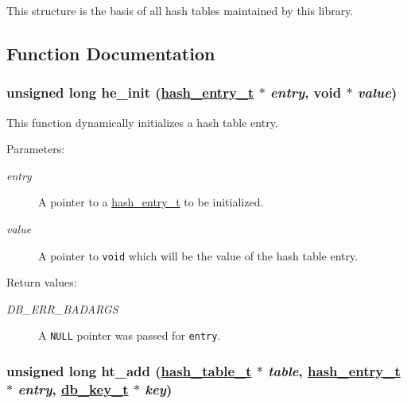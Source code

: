 This structure is the basis of all hash tables maintained by this library. 

\subsection{Function Documentation}
\hypertarget{group__dbprim__hash_a15}{
\subsubsection[he\_\-init]{\setlength{\rightskip}{0pt plus 5cm}unsigned long he\_\-init (\hyperlink{dbprim_8h_a1}{hash\_\-entry\_\-t} $\ast$ {\em entry}, void $\ast$ {\em value})}}
\label{group__dbprim__hash_a15}


This function dynamically initializes a hash table entry.

\begin{Desc}
\item[Parameters:]
\begin{description}
\item[{\em entry}]A pointer to a \hyperlink{group__dbprim__hash_a1}{hash\_\-entry\_\-t} to be initialized. \item[{\em value}]A pointer to {\tt void} which will be the value of the hash table entry.\end{description}
\end{Desc}
\begin{Desc}
\item[Return values:]
\begin{description}
\item[{\em DB\_\-ERR\_\-BADARGS}]A {\tt NULL} pointer was passed for {\tt entry}. \end{description}
\end{Desc}
\hypertarget{group__dbprim__hash_a7}{
\subsubsection[ht\_\-add]{\setlength{\rightskip}{0pt plus 5cm}unsigned long ht\_\-add (\hyperlink{dbprim_8h_a0}{hash\_\-table\_\-t} $\ast$ {\em table}, \hyperlink{dbprim_8h_a1}{hash\_\-entry\_\-t} $\ast$ {\em entry}, \hyperlink{dbprim_8h_a0}{db\_\-key\_\-t} $\ast$ {\em key})}}
\label{group__dbprim__hash_a7}


